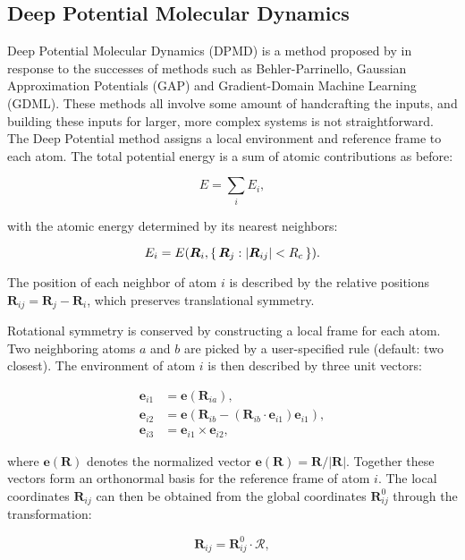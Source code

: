 
\subsection{Deep Potential Molecular Dynamics}
Deep Potential Molecular Dynamics (DPMD) is a method
proposed by \parencite[Zhang et al.]{PhysRevLett.120.143001}
in response to the successes of methods such as Behler-Parrinello,
Gaussian Approximation Potentials (GAP)
and Gradient-Domain Machine Learning (GDML).
These methods all involve some amount of handcrafting the inputs,
and building these inputs for larger, more complex systems is not
straightforward.
The Deep Potential method assigns a local environment and reference
frame to each atom. The total potential energy is a sum
of atomic contributions as before:

$$ E = \sum_i E_i , $$

with the atomic energy determined by its nearest neighbors:

$$ E_i = E(\bm{R}_i, \set{\bm{R}_j : \left| \bm{R}_{ij}
    \right| < R_c}) . $$

The position of each neighbor of atom $i$ is described
by the relative positions $\bm{R}_{ij} = \bm{R}_j - \bm{R}_i$,
which preserves translational symmetry.
\par
Rotational symmetry is conserved by constructing a local frame
for each atom. Two neighboring atoms $a$ and $b$ are picked by a
user-specified rule (default: two closest).
The environment of atom $i$ is then described by three unit vectors:

\begin{equation}
\begin{split}
    \bm{e}_{i1} &= \bm{e}(\bm{R}_{ia}) , \\
    \bm{e}_{i2} &= \bm{e}(\bm{R}_{ib} - (\bm{R}_{ib} \cdot \bm{e}_{i1})
    \bm{e}_{i1}) , \\
    \bm{e}_{i3} &= \bm{e}_{i1} \times \bm{e}_{i2} ,
\end{split}
\end{equation}

where $\bm{e}(\bm{R})$ denotes the normalized vector $\bm{e}(\bm{R})
    = \bm{R} / \left| \bm{R} \right|$. Together these vectors
form an orthonormal basis for the reference frame of atom $i$.
The local coordinates $\bm{R}_{ij}$
can then be obtained from the global coordinates $\bm{R}_{ij}^0$
through the transformation:

\begin{equation}
    \bm{R}_{ij} = \bm{R}_{ij}^0 \cdot \mathcal{R} ,
\end{equation}

